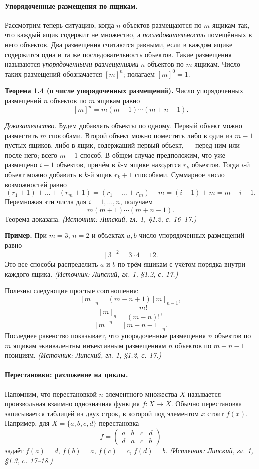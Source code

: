 \documentclass[a4paper,12pt]{article}
\begin{document}
\paragraph{Упорядоченные размещения по ящикам.}
Рассмотрим теперь ситуацию, когда \(n\) объектов размещаются по \(m\) ящикам так, что каждый ящик содержит не множество, а \emph{последовательность} помещённых в него объектов. Два размещения считаются равными, если в каждом ящике содержится одна и та же последовательность объектов. Такие размещения называются \emph{упорядоченными размещениями} \(n\) объектов по \(m\) ящикам. Число таких размещений обозначается \([m]^n\); полагаем \([m]^0=1\).

\textbf{Теорема 1.4 (о числе упорядоченных размещений).} Число упорядоченных размещений \(n\) объектов по \(m\) ящикам равно
\[
[m]^n=m(m+1)\cdots(m+n-1).
\]

\emph{Доказательство.} Будем добавлять объекты по одному. Первый объект можно разместить \(m\) способами. Второй объект можно поместить либо в один из \(m-1\) пустых ящиков, либо в ящик, содержащий первый объект, --- перед ним или после него; всего \(m+1\) способ. В общем случае предположим, что уже размещено \(i-1\) объектов, причём в \(k\)-м ящике находятся \(r_k\) объектов. Тогда \(i\)-й объект можно добавить в \(k\)-й ящик \(r_k+1\) способами. Суммарное число возможностей равно
\[
(r_1+1)+\dots+(r_m+1)=(r_1+\dots+r_m)+m=(i-1)+m=m+i-1.
\]
Перемножая эти числа для \(i=1,\dots,n\), получаем
\[
m(m+1)\cdots(m+n-1).
\]
Теорема доказана.
\textit{(Источник: Липский, гл. 1, §1.2, с. 16--17.)}

\textbf{Пример.} При \(m=3\), \(n=2\) и объектах \(a,b\) число упорядоченных размещений равно
\[
[3]^2=3\cdot4=12.
\]
Это все способы распределить \(a\) и \(b\) по трём ящикам с учётом порядка внутри каждого ящика.
\textit{(Источник: Липский, гл. 1, §1.2, с. 17.)}

Полезны следующие простые соотношения:
\[
[m]_n=(m-n+1)[m]_{n-1},
\]
\[
[m]_n=\frac{m!}{(m-n)!},
\]
\[
[m]^n=[m+n-1]_n.
\]
Последнее равенство показывает, что упорядоченные размещения \(n\) объектов по \(m\) ящикам эквивалентны инъективным размещениям \(n\) объектов по \(m+n-1\) позициям.
\textit{(Источник: Липский, гл. 1, §1.2, с. 17.)}

\paragraph{Перестановки: разложение на циклы.}
Напомним, что перестановкой \(n\)-элементного множества \(X\) называется произвольная взаимно однозначная функция \(f:X\to X\). Обычно перестановка записывается таблицей из двух строк, в которой под элементом \(x\) стоит \(f(x)\). Например, для \(X=\{a,b,c,d\}\) перестановка
\[
f=
\begin{pmatrix}
a & b & c & d\\
d & a & c & b
\end{pmatrix}
\]
задаёт \(f(a)=d\), \(f(b)=a\), \(f(c)=c\), \(f(d)=b\).
\textit{(Источник: Липский, гл. 1, §1.3, с. 17--18.)}
\end{document}
